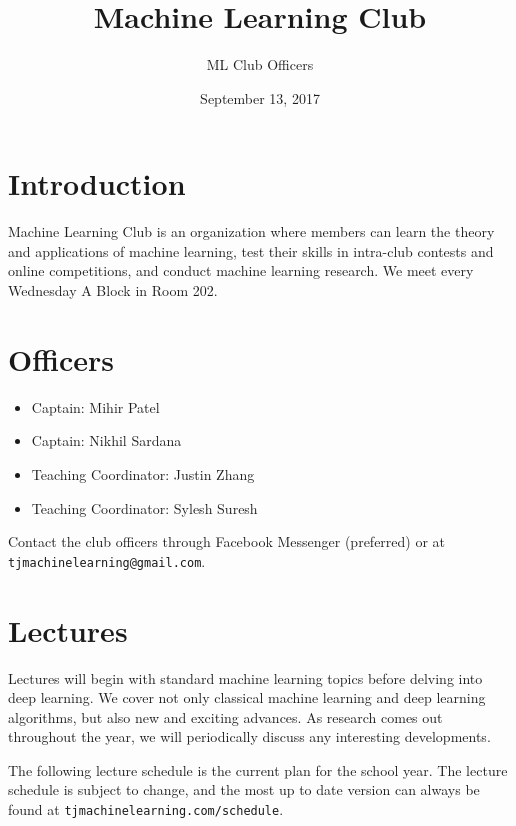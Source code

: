 \documentclass{article}
\title{Machine Learning Club}
\author{ML Club Officers}
\date{September 13, 2017}
\begin{document}
\maketitle

\section{Introduction}
Machine Learning Club is an organization where members can learn the theory and applications of machine learning, test their skills in intra-club contests and online competitions, and conduct machine learning research. We meet every Wednesday A Block in Room 202.

\section{Officers}
\begin{itemize}
    \item Captain: Mihir Patel
    \item Captain: Nikhil Sardana
    \item Teaching Coordinator: Justin Zhang
    \item Teaching Coordinator: Sylesh Suresh
\end{itemize}

Contact the club officers through Facebook Messenger (preferred) or at \texttt{tjmachinelearning@gmail.com}.

\section{Lectures}

Lectures will begin with standard machine learning topics before delving into deep learning. We cover not only classical machine learning and deep learning algorithms, but also new and exciting advances. As research comes out throughout the year, we will periodically discuss any interesting developments. 

The following lecture schedule is the current plan for the school year. The lecture schedule is subject to change, and the most up to date version can always be found at \texttt{tjmachinelearning.com/schedule}.
\end{document}
